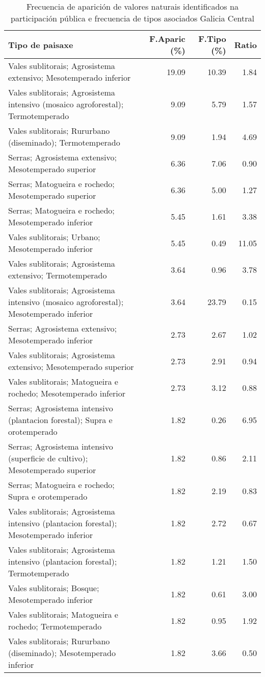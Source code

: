 \begin{table}[p]
\centering
\caption{Frecuencia de aparición de valores naturais identificados na participación pública e frecuencia de tipos asociados Galicia Central} 
\label{vsixotnat7}
\begin{tabular}{lrrr}
  \hline
Tipo de paisaxe & F.Aparic (\%) & F.Tipo (\%) & Ratio \\ 
  \hline
Vales sublitorais; Agrosistema extensivo; Mesotemperado inferior & 19.09 & 10.39 & 1.84 \\ 
  Vales sublitorais; Agrosistema intensivo (mosaico agroforestal); Termotemperado & 9.09 & 5.79 & 1.57 \\ 
  Vales sublitorais; Rururbano (diseminado); Termotemperado & 9.09 & 1.94 & 4.69 \\ 
  Serras; Agrosistema extensivo; Mesotemperado superior & 6.36 & 7.06 & 0.90 \\ 
  Serras; Matogueira e rochedo; Mesotemperado superior & 6.36 & 5.00 & 1.27 \\ 
  Serras; Matogueira e rochedo; Mesotemperado inferior & 5.45 & 1.61 & 3.38 \\ 
  Vales sublitorais; Urbano; Mesotemperado inferior & 5.45 & 0.49 & 11.05 \\ 
  Vales sublitorais; Agrosistema extensivo; Termotemperado & 3.64 & 0.96 & 3.78 \\ 
  Vales sublitorais; Agrosistema intensivo (mosaico agroforestal); Mesotemperado inferior & 3.64 & 23.79 & 0.15 \\ 
  Serras; Agrosistema extensivo; Mesotemperado inferior & 2.73 & 2.67 & 1.02 \\ 
  Vales sublitorais; Agrosistema extensivo; Mesotemperado superior & 2.73 & 2.91 & 0.94 \\ 
  Vales sublitorais; Matogueira e rochedo; Mesotemperado inferior & 2.73 & 3.12 & 0.88 \\ 
  Serras; Agrosistema intensivo (plantacion forestal); Supra e orotemperado & 1.82 & 0.26 & 6.95 \\ 
  Serras; Agrosistema intensivo (superficie de cultivo); Mesotemperado superior & 1.82 & 0.86 & 2.11 \\ 
  Serras; Matogueira e rochedo; Supra e orotemperado & 1.82 & 2.19 & 0.83 \\ 
  Vales sublitorais; Agrosistema intensivo (plantacion forestal); Mesotemperado inferior & 1.82 & 2.72 & 0.67 \\ 
  Vales sublitorais; Agrosistema intensivo (plantacion forestal); Termotemperado & 1.82 & 1.21 & 1.50 \\ 
  Vales sublitorais; Bosque; Mesotemperado inferior & 1.82 & 0.61 & 3.00 \\ 
  Vales sublitorais; Matogueira e rochedo; Termotemperado & 1.82 & 0.95 & 1.92 \\ 
  Vales sublitorais; Rururbano (diseminado); Mesotemperado inferior & 1.82 & 3.66 & 0.50 \\ 
   \hline
\end{tabular}
\end{table}
